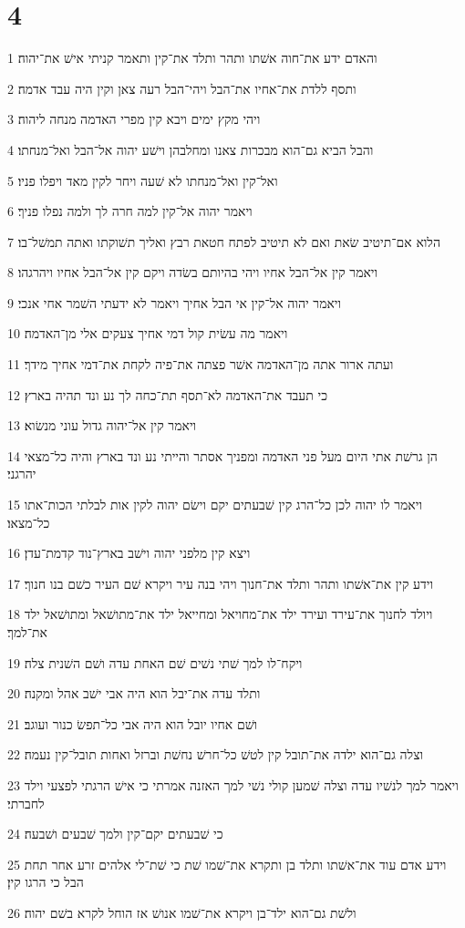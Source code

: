\chapter{4}

\par 1 והאדם ידע את־חוה אשׁתו ותהר ותלד את־קין ותאמר קניתי אישׁ את־יהוה׃
\par 2 ותסף ללדת את־אחיו את־הבל ויהי־הבל רעה צאן וקין היה עבד אדמה׃
\par 3 ויהי מקץ ימים ויבא קין מפרי האדמה מנחה ליהוה׃
\par 4 והבל הביא גם־הוא מבכרות צאנו ומחלבהן וישׁע יהוה אל־הבל ואל־מנחתו׃
\par 5 ואל־קין ואל־מנחתו לא שׁעה ויחר לקין מאד ויפלו פניו׃
\par 6 ויאמר יהוה אל־קין למה חרה לך ולמה נפלו פניך׃
\par 7 הלוא אם־תיטיב שׂאת ואם לא תיטיב לפתח חטאת רבץ ואליך תשׁוקתו ואתה תמשׁל־בו׃
\par 8 ויאמר קין אל־הבל אחיו ויהי בהיותם בשׂדה ויקם קין אל־הבל אחיו ויהרגהו׃
\par 9 ויאמר יהוה אל־קין אי הבל אחיך ויאמר לא ידעתי השׁמר אחי אנכי׃
\par 10 ויאמר מה עשׂית קול דמי אחיך צעקים אלי מן־האדמה׃
\par 11 ועתה ארור אתה מן־האדמה אשׁר פצתה את־פיה לקחת את־דמי אחיך מידך׃
\par 12 כי תעבד את־האדמה לא־תסף תת־כחה לך נע ונד תהיה בארץ׃
\par 13 ויאמר קין אל־יהוה גדול עוני מנשׂוא׃
\par 14 הן גרשׁת אתי היום מעל פני האדמה ומפניך אסתר והייתי נע ונד בארץ והיה כל־מצאי יהרגני׃
\par 15 ויאמר לו יהוה לכן כל־הרג קין שׁבעתים יקם וישׂם יהוה לקין אות לבלתי הכות־אתו כל־מצאו׃
\par 16 ויצא קין מלפני יהוה וישׁב בארץ־נוד קדמת־עדן׃
\par 17 וידע קין את־אשׁתו ותהר ותלד את־חנוך ויהי בנה עיר ויקרא שׁם העיר כשׁם בנו חנוך׃
\par 18 ויולד לחנוך את־עירד ועירד ילד את־מחויאל ומחייאל ילד את־מתושׁאל ומתושׁאל ילד את־למך׃
\par 19 ויקח־לו למך שׁתי נשׁים שׁם האחת עדה ושׁם השׁנית צלה׃
\par 20 ותלד עדה את־יבל הוא היה אבי ישׁב אהל ומקנה׃
\par 21 ושׁם אחיו יובל הוא היה אבי כל־תפשׂ כנור ועוגב׃
\par 22 וצלה גם־הוא ילדה את־תובל קין לטשׁ כל־חרשׁ נחשׁת וברזל ואחות תובל־קין נעמה׃
\par 23 ויאמר למך לנשׁיו עדה וצלה שׁמען קולי נשׁי למך האזנה אמרתי כי אישׁ הרגתי לפצעי וילד לחברתי׃
\par 24 כי שׁבעתים יקם־קין ולמך שׁבעים ושׁבעה׃
\par 25 וידע אדם עוד את־אשׁתו ותלד בן ותקרא את־שׁמו שׁת כי שׁת־לי אלהים זרע אחר תחת הבל כי הרגו קין׃
\par 26 ולשׁת גם־הוא ילד־בן ויקרא את־שׁמו אנושׁ אז הוחל לקרא בשׁם יהוה׃


